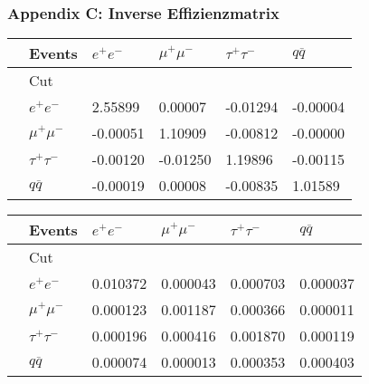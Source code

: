 \begin{frame}
	\frametitle{Appendix C: Inverse Effizienzmatrix}
	\noindent{}
	\centering
	\begin{tabular}{@{}llllll@{}}
		\toprule
		&Events &$e^+e^-$&$\mu^+\mu^-$&$\tau^+\tau^-$&$q\overline{q}$\\
		\midrule
		&Cut&&&&\\
		&$e^+e^-$&2.55899&0.00007&-0.01294&-0.00004\\
		&$\mu^+\mu^-$&-0.00051&1.10909&-0.00812&-0.00000\\
		&$\tau^+\tau^-$&-0.00120&-0.01250&1.19896&-0.00115\\
		&$q\overline{q}$&-0.00019&0.00008&-0.00835&1.01589\\
		\bottomrule
	\end{tabular}
	\noindent{}
	\begin{tabular}{@{}llllll@{}}
		\toprule
		&Events &$e^+e^-$&$\mu^+\mu^-$&$\tau^+\tau^-$&$q\overline{q}$\\
		\midrule
		&Cut&&&&\\
		&$e^+e^-$&0.010372&0.000043&0.000703&0.000037\\
		&$\mu^+\mu^-$&0.000123&0.001187&0.000366&0.000011\\
		&$\tau^+\tau^-$&0.000196&0.000416&0.001870&0.000119\\
		&$q\overline{q}$&0.000074&0.000013&0.000353&0.000403\\
		\bottomrule
	\end{tabular}
\end{frame}